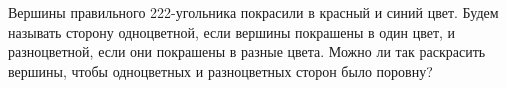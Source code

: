 \documentclass{article}
\begin{document}
\begin{enumerate_boxed}
        \item Вершины правильного 222-угольника покрасили в красный и синий цвет.
        Будем называть сторону одноцветной, если вершины покрашены в один цвет, и разноцветной, если они покрашены в разные цвета.
        Можно ли так раскрасить вершины, чтобы одноцветных и разноцветных сторон было поровну?
    \end{enumerate_boxed}
\end{document}
